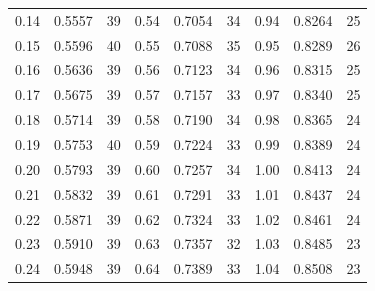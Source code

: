 \documentclass[russian, 12pt, fleqn]{article}
\begin{document}
\begin{center}
\begin{tabular}[b]{ | l | l |  l || l | l | l || l | l | l |   }
0.14&0.5557&39&0.54&0.7054&34&0.94&0.8264&25\\%
0.15&0.5596&40&0.55&0.7088&35&0.95&0.8289&26\\%
0.16&0.5636&39&0.56&0.7123&34&0.96&0.8315&25\\%
0.17&0.5675&39&0.57&0.7157&33&0.97&0.8340&25\\%
0.18&0.5714&39&0.58&0.7190&34&0.98&0.8365&24\\%
0.19&0.5753&40&0.59&0.7224&33&0.99&0.8389&24\\%
0.20&0.5793&39&0.60&0.7257&34&1.00&0.8413&24\\%
0.21&0.5832&39&0.61&0.7291&33&1.01&0.8437&24\\%
0.22&0.5871&39&0.62&0.7324&33&1.02&0.8461&24\\%
0.23&0.5910&39&0.63&0.7357&32&1.03&0.8485&23\\%
0.24&0.5948&39&0.64&0.7389&33&1.04&0.8508&23\\%
\hline
\end{tabular}
\end{center}
\newpage
\noindent 
\end{document}
